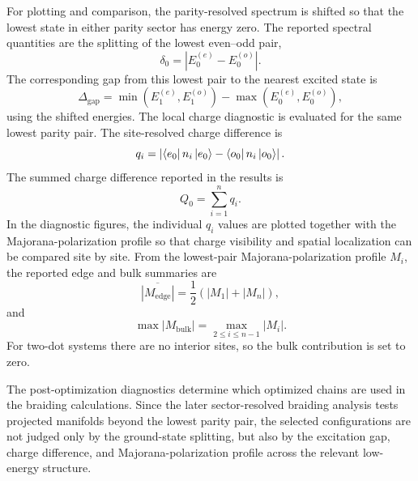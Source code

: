 For plotting and comparison, the parity-resolved spectrum is shifted so that the lowest state in either parity sector has energy zero. The reported spectral quantities are the splitting of the lowest even--odd pair,
\begin{equation}
\delta_0 =
\left|
E_0^{(e)}-E_0^{(o)}
\right|.
\label{eq:method_ground_state_splitting}
\end{equation}
The corresponding gap from this lowest pair to the nearest excited state is
\begin{equation}
\Delta_{\mathrm{gap}}
=
\min\left(E_1^{(e)},E_1^{(o)}\right)
-
\max\left(E_0^{(e)},E_0^{(o)}\right),
\label{eq:method_low_energy_gap}
\end{equation}
using the shifted energies. The local charge diagnostic is evaluated for the same lowest parity pair. The site-resolved charge difference is
\begin{equation}
q_i =
\left|
\bra{e_0}n_i\ket{e_0}
-
\bra{o_0}n_i\ket{o_0}
\right|.
\end{equation}
The summed charge difference reported in the results is
\begin{equation}
Q_0=\sum_{i=1}^{n} q_i .
\label{eq:method_charge_difference}
\end{equation}
In the diagnostic figures, the individual $q_i$ values are plotted together with the Majorana-polarization profile so that charge visibility and spatial localization can be compared site by site. From the lowest-pair Majorana-polarization profile $M_i$, the reported edge and bulk summaries are
\begin{equation}
\overline{|M_{\mathrm{edge}}|}
=
\frac{1}{2}
\left(
|M_1|+|M_n|
\right),
\label{eq:method_edge_polarization}
\end{equation}
and
\begin{equation}
\max |M_{\mathrm{bulk}}|
=
\max_{2\leq i\leq n-1}|M_i|.
\label{eq:method_bulk_polarization}
\end{equation}
For two-dot systems there are no interior sites, so the bulk contribution is set to zero.

The post-optimization diagnostics determine which optimized chains are used in the braiding calculations. Since the later sector-resolved braiding analysis tests projected manifolds beyond the lowest parity pair, the selected configurations are not judged only by the ground-state splitting, but also by the excitation gap, charge difference, and Majorana-polarization profile across the relevant low-energy structure.


